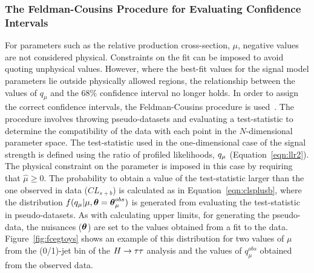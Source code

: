 \subsubsection{The Feldman-Cousins Procedure for Evaluating Confidence Intervals}

For parameters such as the relative production cross-section, $\mu$, negative values 
are not considered physical. Constraints on the fit can be imposed to avoid quoting unphysical values. 
However, where the best-fit values for the signal model parameters lie outside physically
allowed regions, the relationship between the values of $q_\mu$ and
the 68\% confidence interval no longer holds. 
In order to assign the correct confidence intervals, the Feldman-Cousins
procedure is used~\citep{fc}.  
The procedure involves throwing pseudo-datasets and evaluating 
a test-statistic to determine the compatibility of the data with each 
point in the $N$-dimensional parameter space.
The test-statistic used in the one-dimensional case of the signal strength
is defined using the ratio of profiled likelihoods, $q_{\mu}$ (Equation~\ref{eqn:llr2}).
The physical constraint on the parameter is imposed in this case by 
requiring that $\hat{\mu} \ge 0$. 
The probability to obtain a value of the test-statistic larger than the one 
observed in data ($CL_{s+b}$) is calculated as in Equation~\ref{eqn:clsplusb},
where the distribution $f(q_{\mu} | \mu,{\boldsymbol{\theta}}={\boldsymbol{\theta}}_{\mu}^{obs})$ is 
generated from evaluating the test-statistic in pseudo-datasets. 
As with calculating upper limits, for generating the pseudo-data, the nuisances (${\boldsymbol{\theta}}$) 
are set to the values obtained from a fit to the data.
Figure~\ref{fig:fcegtoys} shows an example of this distribution for two 
values of $\mu$ from the (0/1)-jet bin of the $H\rightarrow\tau\tau$ analysis and the values of 
$q_\mu^{obs}$ obtained from the observed data.
